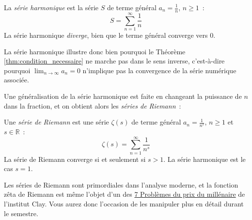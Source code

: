 \begin{boxdef}
La \emph{série harmonique} est la série $S$ de terme général $a_n = \frac{1}{n}$, $n \geq 1$~:
\begin{equation}
S = \sum_{n = 1}^{\infty} \frac{1}{n}
\end{equation}
La série harmonique \emph{diverge}, bien que le terme général converge vers $0$.
\end{boxdef}
La série harmonique illustre donc bien pourquoi le Théorème \ref{thm:condition_necessaire} ne marche pas dans le sens inverse, c'est-à-dire pourquoi $\displaystyle\lim_{n \to \infty} a_n = 0$ n'implique pas la convergence de la série numérique associée.

Une généralisation de la série harmonique est faite en changeant la puissance de $n$ dans la fraction, et on obtient alors les \emph{séries de Riemann}~:
\begin{boxdef}
Une \emph{série de Riemann} est une série $\zeta(s)$ de terme général $a_n = \frac{1}{n^s}$, $n \geq 1$ et $s \in \mathbb{R}$~:
\begin{equation}
\zeta(s) = \sum_{n = 1}^{\infty} \frac{1}{n^s}
\end{equation}
La série de Riemann converge si et seulement si $s > 1$. La série harmonique est le cas $s = 1$.
\end{boxdef}
Les séries de Riemann sont primordiales dans l'analyse moderne, et la fonction zêta de Riemann est même l'objet d'un des \href{https://fr.wikipedia.org/wiki/Probl\%C3\%A8mes_du_prix_du_mill\%C3\%A9naire}{7 Problèmes du prix du millénaire} de l'institut Clay. Vous aurez donc l'occasion de les manipuler plus en détail durant le semestre.